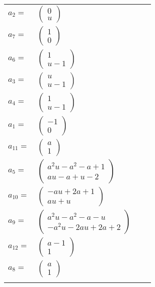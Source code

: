 \documentclass[1p]{elsarticle_modified}
\theoremstyle{definition}
\begin{document}
\begin{tabular}{m{7pt} m{180pt} m{7pt} m{180pt} }
\flushright $a_{2}=$&$\begin{pmatrix}0\\u\end{pmatrix}$ \\
\flushright $a_{7}=$&$\begin{pmatrix}1\\0\end{pmatrix}$ \\
\flushright $a_{6}=$&$\begin{pmatrix}1\\u-1\end{pmatrix}$ \\
\flushright $a_{3}=$&$\begin{pmatrix}u\\u-1\end{pmatrix}$ \\
\flushright $a_{4}=$&$\begin{pmatrix}1\\u-1\end{pmatrix}$ \\
\flushright $a_{1}=$&$\begin{pmatrix}-1\\0\end{pmatrix}$ \\
\flushright $a_{11}=$&$\begin{pmatrix}a\\1\end{pmatrix}$ \\
\flushright $a_{5}=$&$\begin{pmatrix}a^2 u- a^2- a+1\\a u- a+u-2\end{pmatrix}$ \\
\flushright $a_{10}=$&$\begin{pmatrix}- a u+2 a+1\\a u+u\end{pmatrix}$ \\
\flushright $a_{9}=$&$\begin{pmatrix}a^2 u- a^2- a- u\\- a^2 u-2 a u+2 a+2\end{pmatrix}$ \\
\flushright $a_{12}=$&$\begin{pmatrix}a-1\\1\end{pmatrix}$ \\
\flushright $a_{8}=$&$\begin{pmatrix}a\\1\end{pmatrix}$\\&\end{tabular}
\end{document}
